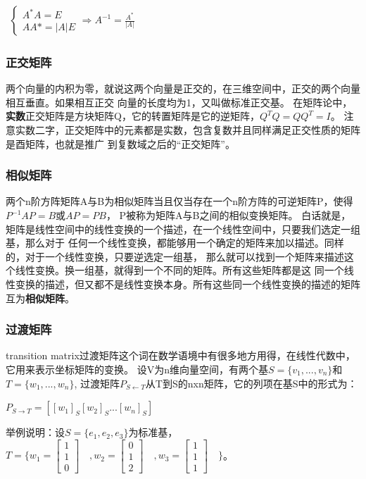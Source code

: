 \begin{math}
    \begin{aligned}
\begin{cases} A^*A=E\\ AA*=|A|E \end{cases} \Rightarrow A^{-1}=\frac{A^*}{|A|}
\end{aligned}
\end{math}


\subsubsection{正交矩阵}
两个向量的内积为零，就说这两个向量是正交的，在三维空间中，正交的两个向量相互垂直。如果相互正交
向量的长度均为1，又叫做标准正交基。
在矩阵论中，\textbf{实数}正交矩阵是方块矩阵Q，它的转置矩阵是它的逆矩阵，$Q^TQ=QQ^T=I$。
注意实数二字，正交矩阵中的元素都是实数，包含复数并且同样满足正交性质的矩阵是酉矩阵，也就是推广
到复数域之后的“正交矩阵”。

\subsubsection{相似矩阵}
两个n阶方阵矩阵A与B为相似矩阵当且仅当存在一个n阶方阵的可逆矩阵P，使得$P^{-1}AP=B$或$AP=PB$，
P被称为矩阵A与B之间的相似变换矩阵。
白话就是，矩阵是线性空间中的线性变换的一个描述，在一个线性空间中，只要我们选定一组基，那么对于
任何一个线性变换，都能够用一个确定的矩阵来加以描述。同样的，对于一个线性变换，只要逆选定一组基，
那么就可以找到一个矩阵来描述这个线性变换。换一组基，就得到一个不同的矩阵。所有这些矩阵都是这
同一个线性变换的描述，但又都不是线性变换本身。所有这些同一个线性变换的描述的矩阵互为\textbf{相似矩阵}。

\subsubsection{过渡矩阵}
transition matrix过渡矩阵这个词在数学语境中有很多地方用得，在线性代数中，它用来表示坐标矩阵的变换。
\newline
设V为n维向量空间，有两个基$S=\{v_1,...,v_n\}$和$T=\{w_1,...,w_n\}$,
过渡矩阵$P_{S \leftarrow T}$从T到S的nxn矩阵，它的列项在基S中的形式为：

\begin{math}
    P_{S \rightarrow T} = [[w_1]_S [w_2]_S ... [w_n]_S]
\end{math}

举例说明：设$S=\{ e_1,e_2,e_3\}$为标准基，$T=\{ w_1=\begin{bmatrix} 1\\ 1\\ 0 \end{bmatrix}\quad, w_2=\begin{bmatrix}0\\1\\2\end{bmatrix}\quad 
, w_3=\begin{bmatrix} 1\\1\\1 \end{bmatrix}\quad \}$。

